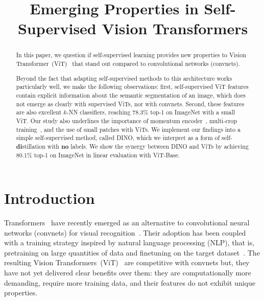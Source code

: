 \title{Emerging Properties in Self-Supervised Vision Transformers}

\begin{abstract}
In this paper, we question if self-supervised learning provides new properties to Vision Transformer~(ViT)~\cite{dosovitskiy2020image} that stand out compared to convolutional networks (convnets).

Beyond the fact that adapting self-supervised methods to this architecture works particularly well, we make the following observations: first, self-supervised ViT features contain explicit information about the semantic segmentation of an image, which does not emerge as clearly with supervised ViTs, nor with convnets. Second, these features are also excellent $k$-NN classifiers, reaching 78.3\% top-1 on ImageNet with a small ViT. Our study also underlines the importance of momentum encoder~\cite{he2020momentum}, multi-crop training~\cite{caron2020unsupervised}, and the use of small patches with ViTs. We implement our findings into a simple self-supervised method, called DINO, which we interpret as a form of self-\textbf{di}stillation with \textbf{no} labels. We show the synergy between DINO and ViTs by achieving 80.1\% top-1 on ImageNet in linear evaluation with ViT-Base.
\end{abstract}

\section{Introduction}
Transformers~\cite{vaswani2017attention} have recently emerged as an alternative to convolutional neural networks (convnets) for visual recognition~\cite{dosovitskiy2020image,touvron2020training,zhao2020exploring}. Their adoption has been coupled with a training strategy inspired by natural language processing (NLP), that is, pretraining on large quantities of data and finetuning on the target dataset~\cite{devlin2018bert,radford2019language}. The resulting Vision Transformers~(ViT)~\cite{dosovitskiy2020image} are competitive with convnets but, they have not yet delivered clear benefits over them: they are computationally more demanding, require more training data, and their features do not exhibit unique properties. 


